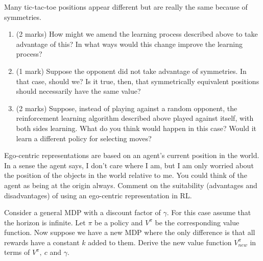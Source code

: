 \documentclass[addpoints,12pt,solution]{exam}
\begin{document}
\begin{questions}
\question[5]Many tic-tac-toe positions appear different but are really the same because of symmetries. 
\begin{enumerate}[label=(\alph*)]
    \item (2 marks) How might we amend the learning process described above to take advantage of this? In what ways would this change improve the learning process? 
    
\begin{solution}
\end{solution}

    \item (1 mark) Suppose the opponent did not take advantage of symmetries. In that case, should we? Is it true, then, that symmetrically equivalent positions should necessarily have the same value? 
    
\begin{solution}
\end{solution}

    \item (2 marks) Suppose, instead of playing against a random opponent, the reinforcement learning algorithm described above played against itself, with both sides learning. What do you think  would happen in this case? Would it learn a different policy for selecting moves? 
    
\begin{solution}
\end{solution}

\end{enumerate}

\question[1]Ego-centric representations are based on an agent's current
position in the world. In a sense the agent says, I don’t care where
I am, but I am only worried about the position of the objects in the
world relative to me. You could think of the agent as being at the origin
always. Comment on the suitability (advantages and disadvantages)
of using an ego-centric representation in RL.

\begin{solution}
\end{solution}

\question[2] Consider a general MDP with a discount factor of $\gamma$.
For this case assume that the horizon is infinite. Let $\pi$ be a policy and $V^{\pi}$ be the corresponding value function. Now suppose we have a new
MDP where the only difference is that all rewards have a constant $k$ added to them. Derive the new value function $V^{\pi}_{new}$ in terms of $V^{\pi},\ c$ and $\gamma$.


\end{questions}
\end{document}
